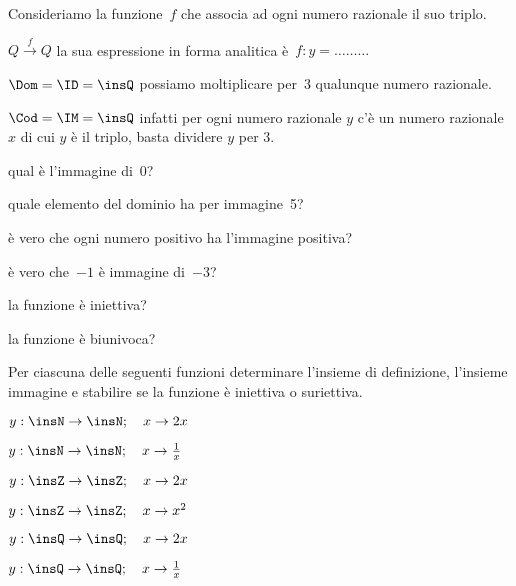 \begin{esercizio}
 \label{ese:D.10}
Consideriamo la funzione~\(f\) che associa ad ogni numero razionale il suo triplo.

\(Q\overset{{f}}{{\rightarrow }}Q\) la sua espressione in forma
analitica è~\(f: y = {\dots}{\dots}{\dots}\)

\(\Dom = \ID = \insQ\) possiamo moltiplicare per~3 qualunque numero razionale.

\(\Cod = \IM =\insQ\) infatti per ogni numero razionale \(y\) c'è un numero 
razionale \(x\) di cui \(y\) è il triplo, basta dividere \(y\) per 3.
%
\vspace{-6pt}
\begin{enumeratea}
\item qual è l'immagine di~0?\dotfill
\item quale elemento del dominio ha per immagine~5?\dotfill
\item è vero che ogni numero positivo ha l'immagine positiva?\dotfill
\item è vero che~\(-1\) è immagine di~\(-3\)?\dotfill
\item la funzione è iniettiva?
\item la funzione è biunivoca?
\end{enumeratea}
\end{esercizio}

\newpage %

\begin{esercizio}
 \label{ese:D.11}
Per ciascuna delle seguenti funzioni determinare l'insieme di definizione, 
l'insieme
immagine e stabilire se la funzione è iniettiva o suriettiva.
\begin{multicols}{3}
\begin{enumeratea}
\item \(y:\insN\rightarrow\insN;\quad x \rightarrow 2x\)
\item \(y:\insN\rightarrow\insN;\quad x \rightarrow \frac{1}{x}\)
\item \(y:\insZ\rightarrow\insZ;\quad x \rightarrow 2x\)
\item \(y:\insZ\rightarrow\insZ;\quad x \rightarrow x^{2}\)
\item \(y:\insQ\rightarrow\insQ;\quad x \rightarrow 2x\)
\item \(y:\insQ\rightarrow\insQ;\quad x \rightarrow \frac{1}{x}\)
\end{enumeratea}
\end{multicols}
\end{esercizio}

